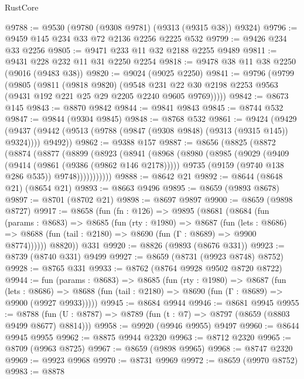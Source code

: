 \begin{lexlean}{RustCore}
\begin{coremodule}
@9788 := @9530 (@9780 (@9308 @9781) (@9313 (@9315 @38)) @9324)
@9796 := @9459 @145 @234 @33 @72 @2136 @2256 @2225 @532
@9799 := @9426 @234 @33 @2256
@9805 := @9471 @233 @11 @32 @2188 @2255 @9489
@9811 := @9431 @228 @232 @11 @31 @2250 @2254
@9818 := @9478 @38 @11 @38 @2250 (@9016 (@9483 @38))
@9820 := @9024 (@9025 @2250)
@9841 := @9796
    (@9799
      (@9805
        (@9811
          (@9818 @9820)
          (@9548
            @231
            @22
            @30
            @2198
            @2253
            @9563
            (@9431 @192 @221 @25 @29 @2205 @2240 @9605 @9769)))))
@9842 := @8673 @145
@9843 := @8870 @9842
@9844 := @9841 @9843
@9845 := @8744 @532
@9847 := @9844 (@9304 @9845)
@9848 := @8768 @532
@9861 := @9424
    (@9429 (@9437 (@9442 (@9513 (@9788 (@9847 (@9308 @9848) (@9313 (@9315 @145)) @9324)))) @9492))
@9862 := @9388 @157
@9887 := @8656
    (@8825
      (@8872
        (@8874
          (@8877
            (@8899
              (@8923
                (@8941
                  (@8968
                    (@8980
                      (@8985
                        (@9029
                          (@9409 (@9414 (@9861 (@9386 (@9862 @146 @2178)))))
                          @9735
                          (@9159 (@9740 @138 @286 @535))
                          @9748)))))))))))
@9888 := @8642 @21
@9892 := @8644 (@8648 @21) (@8654 @21)
@9893 := @8663 @9496
@9895 := @8659 (@9893 @8678)
@9897 := @8701 (@8702 @21)
@9898 := @8697 @9897
@9900 := @8659 (@9898 @8727)
@9917 := @8658
    (fun (fn : @126) =>
    @9895
      (@8681
        (@8684
          (fun (params : @8683) =>
          @8685
            (fun (rty : @1980) =>
            @8687
              (fun (lets : @8686) =>
              @8688 (fun (tail : @2180) => @8690 (fun (Γ : @8689) => @9900 @8774))))))
        @8820))
    @331
@9920 := @8826 (@9893 (@8676 @331))
@9923 := @8739 (@8740 @331) @9499
@9927 := @8659 (@8731 (@9923 @8748) @8752)
@9928 := @8765 @331
@9933 := @8762 (@8764 @9928 @9502 @8720 @8722)
@9944 := fun (params : @8683) =>
  @8685
    (fun (rty : @1980) =>
    @8687
      (fun (lets : @8686) =>
      @8688 (fun (tail : @2180) => @8690 (fun (Γ : @8689) => @9900 (@9927 @9933)))))
@9945 := @8684 @9944
@9946 := @8681 @9945
@9955 := @8788 (fun (U : @8787) => @8789 (fun (t : @7) => @8797 (@8659 (@8803 @9499 @8677) @8814)))
@9958 := @9920 (@9946 @9955) @9497
@9960 := @8644 @9945 @9955
@9962 := @8875 @9944 @2320
@9963 := @8712 @2320
@9965 := @8709 (@9963 @8725)
@9967 := @8659 (@9898 @9965)
@9968 := @8747 @2320
@9969 := @9923 @9968
@9970 := @8731 @9969
@9972 := @8659 (@9970 @8752)
@9983 := @8878

\end{coremodule}
\end{lexlean}
